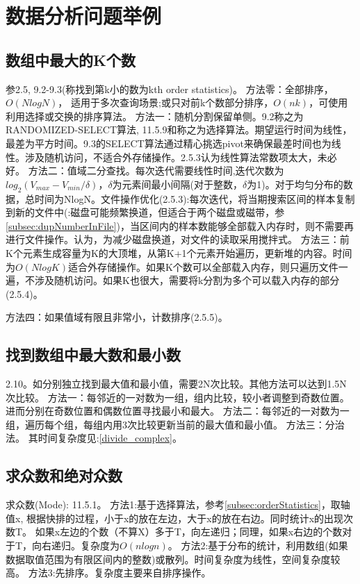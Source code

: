 \section{数据分析问题举例}

\subsection{数组中最大的K个数}
参\cite{bop}2.5, \cite{ita}9.2-9.3(\cite{ita}称找到第k小的数为kth order statistics)。
方法零：全部排序，$O(NlogN)$， 适用于多次查询场景;或只对前k个数部分排序，$O(nk)$，可使用利用选择或交换的排序算法\cite{subsec:sortAthmClass}。
方法一：随机分割保留单侧。\cite{ita}9.2称之为RANDOMIZED-SELECT算法, \cite{pp}11.5.9和\cite{wikipedia}称之为选择算法。期望运行时间为线性，最差为平方时间。\cite{ita}9.3的SELECT算法通过精心挑选pivot来确保最差时间也为线性。涉及随机访问，不适合外存储操作。\cite{bop}2.5.3认为线性算法常数项太大，未必好。
方法二：值域二分查找。每次迭代需要线性时间,迭代次数为$log_{2}(V_{max}-V_{min}/\delta)$，$\delta$为元素间最小间隔(对于整数，$\delta$为1)。对于均匀分布的数据，总时间为NlogN。文件操作优化(\cite{bop}2.5.3):每次迭代，将当期搜索区间的样本复制到新的文件中(\cite{self}:磁盘可能频繁换道，但适合于两个磁盘或磁带，参\ref{subsec:dupNumberInFile})，当区间内的样本数能够全部载入内存时，则不需要再进行文件操作。\cite{self}认为，为减少磁盘换道，对文件的读取采用搅拌式。
方法三：前K个元素生成容量为K的大顶堆，从第K+1个元素开始遍历，更新堆的内容。时间为$O(NlogK)$适合外存储操作。如果K个数可以全部载入内存，则只遍历文件一遍，不涉及随机访问。如果K也很大，需要将k分割为多个可以载入内存的部分(\cite{bop}2.5.4)。
\label{subsec:orderStatistics}

方法四：如果值域有限且非常小，计数排序(\cite{bop}2.5.5)。
\subsection{找到数组中最大数和最小数}
\cite{bop}2.10。如分别独立找到最大值和最小值，需要2N次比较。其他方法可以达到1.5N次比较。
方法一：每邻近的一对数为一组，组内比较，较小者调整到奇数位置。进而分别在奇数位置和偶数位置寻找最小和最大。
方法二：每邻近的一对数为一组，遍历每个组，每组内用3次比较更新当前的最大值和最小值。
方法三：分治法。
其时间复杂度见:\ref{divide_complex}。


\subsection{求众数和绝对众数}
求众数(Mode):
\cite{pp}11.5.1。
方法1:基于选择算法，参考\ref{subsec:orderStatistics}，取轴值x, 根据快排的过程，小于x的放在左边，大于x的放在右边。同时统计x的出现次数T。 如果x左边的个数（不算X）多于T，向左递归；同理，如果x右边的个数对于T，向右递归。复杂度为$O(nlogn)$。
方法2:基于分布的统计，利用数组(如果数据取值范围为有限区间内的整数)或散列。时间复杂度为线性，空间复杂度较高。
方法3:先排序。复杂度主要来自排序操作。


